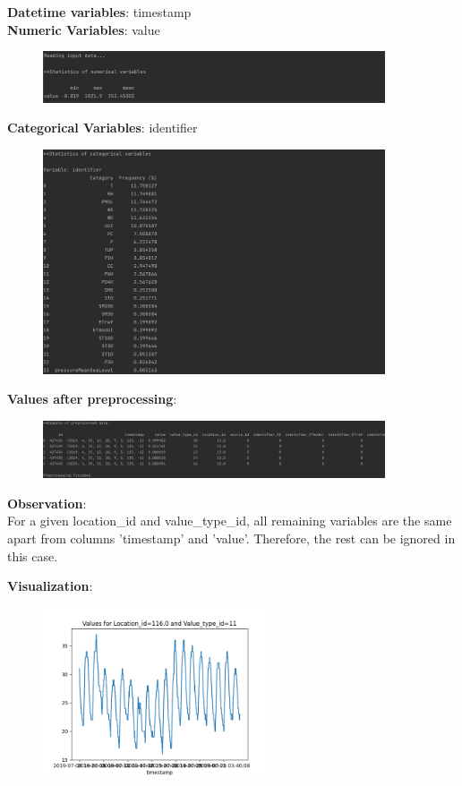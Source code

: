 \documentclass{foxelas_report}
\begin{document}
\textbf{Datetime variables}: timestamp\\
\textbf{Numeric Variables}: value
\begin{figure}[H]
\includegraphics[width=0.9\textwidth]{img1.JPG}
\end{figure}

\textbf{Categorical Variables}: identifier
\begin{figure}[H]
\includegraphics[width=0.9\textwidth]{img2.JPG}
\end{figure}

\textbf{Values after preprocessing}:\\

\begin{figure}[H]
\includegraphics[width=0.9\textwidth]{img3.JPG}
\end{figure}

\textbf{Observation}: \\
For a given location\_id and value\_type\_id, all remaining variables are the same apart from columns 'timestamp' and 'value'. Therefore, the rest can be ignored in this case. 

\pagebreak
\textbf{Visualization}:\\

\begin{figure}[H]
\includegraphics[width=0.6\textwidth]{vis_data_11_116.0.png}
\end{figure}
\end{document}
